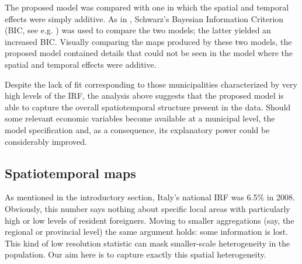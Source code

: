 The proposed model was compared with one in which the spatial and temporal effects were simply additive. As in , Schwarz's Bayesian Information Criterion (BIC, see e.g. \cite[p. 286]{burnhamanderson}) was used to compare the two models; the latter yielded an increased BIC. Visually comparing the maps produced by these two models, the proposed model contained details that could not be seen in the model where the spatial and temporal effects were additive.

Despite the lack of fit corresponding to those municipalities characterized by very high levels of the IRF, the analysis above suggests that the proposed model is able to capture the overall spatiotemporal structure present in the data. Should some relevant economic variables become available at a municipal level, the model specification and, as a consequence, its explanatory power could be considerably improved. 

\subsection{Spatiotemporal maps \label{STT}}

As mentioned in the introductory section, Italy's national IRF was 6.5\% in 2008. Obviously, this number says nothing about specific local areas with particularly high or low levels of resident foreigners. Moving to smaller aggregations (say, the regional or provincial level) the same argument holds: some information is lost. This kind of low resolution statistic can mask smaller-scale heterogeneity in the population. Our aim here is to capture exactly this spatial heterogeneity.

